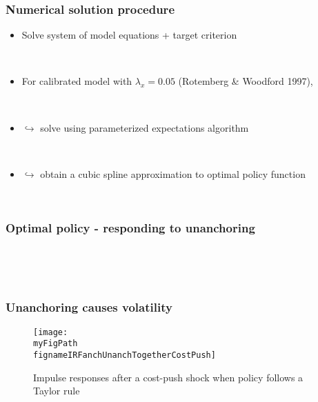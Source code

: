 \documentclass[10pt]{beamer}
\def \myFigPath {../../../figures/}
\def\fignameDiDpibar{analyze_opt_policy_ip18_Oct_2020} %
\def\fignameHistPib{analyze_opt_policy_hist_pib_18_Oct_2020}
\def\fignameIRFanchUnanchTogetherCostPush{RIR_together_psi_pi1_5_command_IRFs_approx_pretty_2020_10_25}
\begin{document}
\begin{frame}
	\frametitle{Numerical solution procedure}
	
\begin{itemize}
\item[] Solve system of model equations + target criterion 

\

\item[] For calibrated model with $\lambda_x = 0.05$ (Rotemberg \& Woodford 1997),


\

\item[] $\hookrightarrow$ solve using parameterized expectations algorithm

\


\item[] $\hookrightarrow$ obtain a cubic spline approximation to optimal policy function

\

\end{itemize}


\end{frame}



\begin{frame}
	\frametitle{Optimal policy - responding to unanchoring }
	
\begin{figure}[h!]
\footnotesize
\end{figure} 

\



 
 \



\end{frame}

\begin{frame}
	\frametitle{Unanchoring causes volatility}\label{IRF1}

\begin{figure}[h!]
\texttt{[image: \\myFigPath \\fignameIRFanchUnanchTogetherCostPush]}
\caption{Impulse responses after a cost-push shock when policy follows a Taylor rule}
\label{IRF}
\end{figure}	

\vfill
\vspace{-0.9cm}
\hfill \hyperlink{oscillatory}{}
\end{frame}
\end{document}
